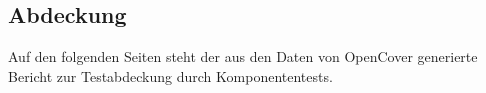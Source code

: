 %






\subsection{Abdeckung}
\label{Abschnitt:Tests:Statistik:Abdeckung}


Auf den folgenden Seiten steht der aus den Daten von OpenCover generierte Bericht zur Testabdeckung durch Komponententests.



\thispagestyle{empty}
\pagestyle{empty}

\begin{figure}[h!]

   
\end{figure}


%
%   

\restoregeometry